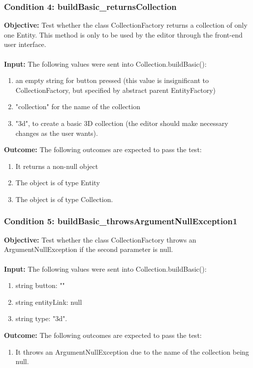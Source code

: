\documentclass[a4paper,12pt]{article}
\begin{document}
		\subsubsection{Condition 4: buildBasic\_returnsCollection}
			\textbf{Objective:} Test whether the class CollectionFactory returns a collection of only one Entity. This method is only to be used by the editor through the front-end user interface.\\\\
			\textbf{Input:} The following values were sent into Collection.buildBasic():
				\begin{enumerate}
					\item an empty string for button pressed (this value is insignificant to CollectionFactory, but specified by abstract parent EntityFactory)
					\item "collection" for the name of the collection
					\item "3d", to create a basic 3D collection (the editor should make necessary changes as the user wants).\\
				\end{enumerate}
			\textbf{Outcome:} The following outcomes are expected to pass the test:
				\begin{enumerate}
					\item It returns a non-null object
					\item The object is of type Entity
					\item The object is of type Collection.
				\end{enumerate}
		\subsubsection{Condition 5: buildBasic\_throwsArgumentNullException1}
			\textbf{Objective:} Test whether the class CollectionFactory throws an ArgumentNullException if the second parameter is null.\\\\
			\textbf{Input:} The following values were sent into Collection.buildBasic():
				\begin{enumerate}
					\item string button: ""
					\item string entityLink: null
					\item string type: "3d".\\
				\end{enumerate}
			\textbf{Outcome:} The following outcomes are expected to pass the test:
				\begin{enumerate}
					\item It throws an ArgumentNullException due to the name of the collection being null.
				\end{enumerate}
				
\end{document}
